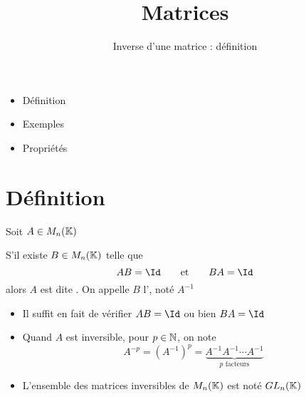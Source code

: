 






\title{{\bf Matrices}}
\subtitle{Inverse d'une matrice : définition}

\begin{frame}
  
  \debutmontitre

  \pause

{\footnotesize
\hfill
{}
\begin{minipage}{0.6\textwidth}
  \begin{itemize}
    \item<3-> Définition
    \item<4-> Exemples
    \item<5-> Propriétés
  \end{itemize}
\end{minipage}
}

\end{frame}

\setcounter{framenumber}{0}


\section{Définition}

\begin{frame}
\begin{mydefinition}%
Soit $A\in M_n(\mathbb{K})$

\pause
S'il existe $B\in M_n(\mathbb{K})$ telle que
 $$ AB = \Id \qquad \text{et} \qquad BA = \Id $$
alors $A$ est dite . \pause On appelle $B$ l', noté $A^{-1}$
\end{mydefinition}

\begin{itemize}
\item\pause Il suffit en fait de vérifier $AB=\Id$ ou bien $BA=\Id$
\item\pause Quand $A$ est inversible, pour $p\in \mathbb{N}$, on note  
$$A^{-p}=(A^{-1})^p = \underbrace{A^{-1} A^{-1} \cdots A^{-1}}_{{p \text{ facteurs}}}$$
\item\pause L'ensemble des matrices inversibles de $M_{n}(\mathbb{K})$ est noté $GL_{n}(\mathbb{K})$
\end{itemize}

\end{frame}

